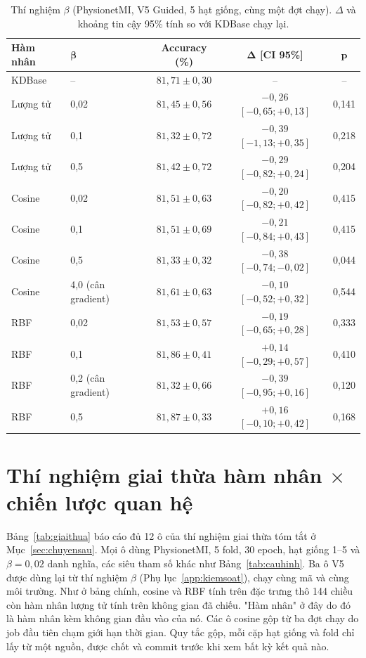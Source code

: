 \begin{table}[!htbp]
\centering
\caption{Thí nghiệm $\beta$ (PhysionetMI, V5 Guided, 5 hạt giống, cùng một
đợt chạy). $\Delta$ và khoảng tin cậy 95\% tính so với KDBase chạy lại.}
\label{tab:betagrid}
\small
\begin{tabular}{llccc}
\toprule
\textbf{Hàm nhân} & $\boldsymbol{\beta}$ & \textbf{Accuracy (\%)} & $\boldsymbol{\Delta}$ \textbf{[CI 95\%]} & $\boldsymbol{p}$ \\
\midrule
KDBase & -- & $81{,}71 \pm 0{,}30$ & -- & -- \\
\midrule
Lượng tử & 0,02 & $81{,}45 \pm 0{,}56$ & $-0{,}26$ $[-0{,}65; +0{,}13]$ & 0,141 \\
Lượng tử & 0,1 & $81{,}32 \pm 0{,}72$ & $-0{,}39$ $[-1{,}13; +0{,}35]$ & 0,218 \\
Lượng tử & 0,5 & $81{,}42 \pm 0{,}72$ & $-0{,}29$ $[-0{,}82; +0{,}24]$ & 0,204 \\
\midrule
Cosine & 0,02 & $81{,}51 \pm 0{,}63$ & $-0{,}20$ $[-0{,}82; +0{,}42]$ & 0,415 \\
Cosine & 0,1 & $81{,}51 \pm 0{,}69$ & $-0{,}21$ $[-0{,}84; +0{,}43]$ & 0,415 \\
Cosine & 0,5 & $81{,}33 \pm 0{,}32$ & $-0{,}38$ $[-0{,}74; -0{,}02]$ & 0,044 \\
Cosine & 4,0 (cân gradient) & $81{,}61 \pm 0{,}63$ & $-0{,}10$ $[-0{,}52; +0{,}32]$ & 0,544 \\
\midrule
RBF & 0,02 & $81{,}53 \pm 0{,}57$ & $-0{,}19$ $[-0{,}65; +0{,}28]$ & 0,333 \\
RBF & 0,1 & $81{,}86 \pm 0{,}41$ & $+0{,}14$ $[-0{,}29; +0{,}57]$ & 0,410 \\
RBF & 0,2 (cân gradient) & $81{,}32 \pm 0{,}66$ & $-0{,}39$ $[-0{,}95; +0{,}16]$ & 0,120 \\
RBF & 0,5 & $81{,}87 \pm 0{,}33$ & $+0{,}16$ $[-0{,}10; +0{,}42]$ & 0,168 \\
\bottomrule
\end{tabular}
\end{table}
\FloatBarrier

\section{Thí nghiệm giai thừa hàm nhân $\times$ chiến lược quan hệ}
\label{app:giaithua}

Bảng~\ref{tab:giaithua} báo cáo đủ 12 ô của thí nghiệm giai thừa tóm tắt ở
Mục~\ref{sec:chuyensau}. Mọi ô dùng PhysionetMI, 5 fold, 30 epoch, hạt giống
1--5 và $\beta = 0{,}02$ danh nghĩa, các siêu tham số khác như
Bảng~\ref{tab:cauhinh}. Ba ô V5 được dùng lại từ thí nghiệm $\beta$
(Phụ lục~\ref{app:kiemsoat}), chạy cùng mã và cùng môi trường. Như ở bảng
chính, cosine và RBF tính trên đặc trưng thô 144 chiều còn hàm nhân lượng tử
tính trên không gian đã chiếu. "Hàm nhân" ở đây do đó là hàm nhân kèm không
gian đầu vào của nó. Các ô cosine gộp từ ba đợt chạy do job đầu tiên chạm
giới hạn thời gian. Quy tắc gộp, mỗi cặp hạt giống và fold chỉ lấy từ một
nguồn, được chốt và commit trước khi xem bất kỳ kết quả nào.

